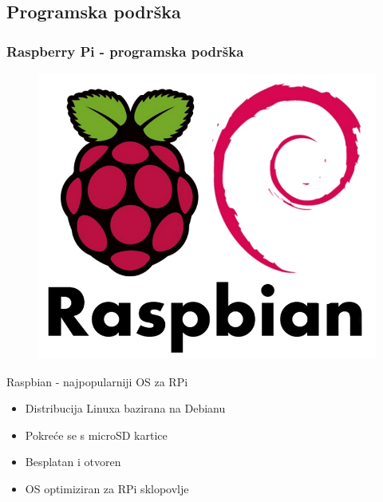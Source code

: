 \documentclass[12pt]{beamer}
\begin{document}
\subsection{Programska podrška}
\begin{frame}
	\frametitle{Raspberry Pi - programska podrška}
	\begin{figure}[h]
			\begin{minipage}{0.2\textwidth}
				\centering
				\includegraphics[width=\linewidth]{slike/raspbian-logo.png}
			\end{minipage}
		\end{figure}
	Raspbian - najpopularniji OS za RPi
	\begin{itemize}
		\item Distribucija Linuxa bazirana na Debianu
		\item Pokreće se s microSD kartice
		\item Besplatan i otvoren
		\item OS optimiziran za RPi sklopovlje
	\end{itemize}
\end{frame}
\end{document}

